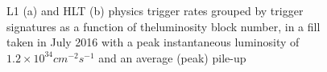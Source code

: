 \documentclass[a4paper, oneside]{book}
\begin{document}
					\begin{figure} [H]
						\centering
						 \quad
						\caption{L1 (a) and HLT (b) physics trigger rates grouped by trigger signatures as a function of theluminosity block number, in a fill taken in July 2016 with a peak instantaneous luminosity of $1.2 \times 10^{34}cm^{-2}s^{-1}$ and an average (peak) pile-up }
						\label{fig:Trigger system}
					\end{figure}
					
				
				
\end{document}
